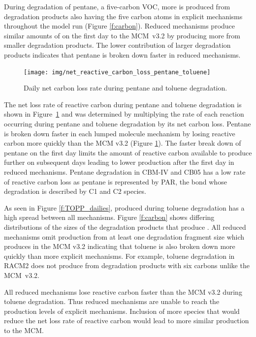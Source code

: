 During degradation of pentane, a five-carbon VOC, more  is produced from degradation products also having the five carbon atoms in explicit mechanisms throughout the model run (Figure \ref{f:carbon}).
Reduced mechanisms produce similar amounts of  on the first day to the \mbox{MCM v3.2} by producing more  from smaller degradation products.
The lower contribution of larger degradation products indicates that pentane is broken down faster in reduced mechanisms.
%
\begin{figure}
    \centering
    \texttt{[image: img/net\_reactive\_carbon\_loss\_pentane\_toluene]}
    \vspace{0mm}
    \caption{Daily net carbon loss rate during pentane and toluene degradation.}
    \vspace{-4mm}
    \label{f:net_carbon_loss}
\end{figure}
%
The net loss rate of reactive carbon during pentane and toluene degradation is shown in \mbox{Figure \ref{f:net_carbon_loss}} and was determined by multiplying the rate of each reaction occurring during pentane and toluene degradation by its net carbon loss.
Pentane is broken down faster in each lumped molecule mechanism by losing reactive carbon more quickly than the MCM v3.2 (Figure \ref{f:net_carbon_loss}).
The faster break down of pentane on the first day limits the amount of reactive carbon available to produce further  on subsequent days leading to lower  production after the first day in reduced mechanisms.
Pentane degradation in CBM-IV and CB05 has a low rate of reactive carbon loss as pentane is represented by PAR, the  bond whose degradation is described by C1 and C2 species.

As seen in Figure \ref{f:TOPP_dailies},  produced during toluene degradation has a high spread between all mechanisms.
Figure \ref{f:carbon} shows differing distributions of the sizes of the degradation products that produce .
All reduced mechanisms omit  production from at least one degradation fragment size which produces  in the MCM v3.2 indicating that toluene is also broken down more quickly than more explicit mechanisms.
For example, toluene degradation in RACM2 does not produce  from degradation products with six carbons unlike the \mbox{MCM v3.2}.

All reduced mechanisms lose reactive carbon faster than the MCM v3.2 during toluene degradation.
Thus reduced mechanisms are unable to reach the  production levels of explicit mechanisms.
Inclusion of more species that would reduce the net loss rate of reactive carbon would lead to more similar  production to the MCM.
